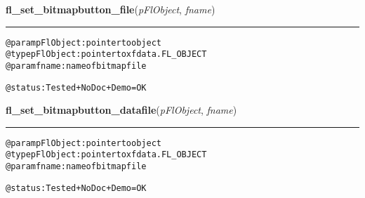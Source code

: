     \label{xformslib:flbitmap:fl_set_bitmap_file}

    \vspace{0.5ex}

\hspace{.8\funcindent}\begin{boxedminipage}{\funcwidth}

    \raggedright \textbf{fl\_set\_bitmapbutton\_file}(\textit{pFlObject}, \textit{fname})

    \vspace{-1.5ex}

    \rule{\textwidth}{0.5\fboxrule}
\setlength{\parskip}{2ex}
\begin{alltt}
        @param pFlObject: pointer to object
@type pFlObject: pointer to xfdata.FL\_OBJECT
        @param fname: name of bitmap file

        @status: Tested + NoDoc + Demo = OK
    
\end{alltt}

\setlength{\parskip}{1ex}
    \end{boxedminipage}

    \label{xformslib:flbitmap:fl_set_bitmap_file}

    \vspace{0.5ex}

\hspace{.8\funcindent}\begin{boxedminipage}{\funcwidth}

    \raggedright \textbf{fl\_set\_bitmapbutton\_datafile}(\textit{pFlObject}, \textit{fname})

    \vspace{-1.5ex}

    \rule{\textwidth}{0.5\fboxrule}
\setlength{\parskip}{2ex}
\begin{alltt}
        @param pFlObject: pointer to object
@type pFlObject: pointer to xfdata.FL\_OBJECT
        @param fname: name of bitmap file

        @status: Tested + NoDoc + Demo = OK
    
\end{alltt}

\setlength{\parskip}{1ex}
    \end{boxedminipage}

